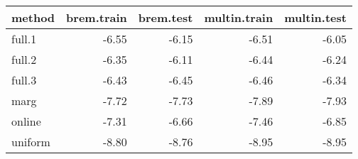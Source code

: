 \begin{table}[ht]
\begin{center}
\begin{tabular}{lrrrr}
  \hline
method & brem.train & brem.test & multin.train & multin.test \\ 
  \hline
full.1 & -6.55 & -6.15 & -6.51 & -6.05 \\ 
  full.2 & -6.35 & -6.11 & -6.44 & -6.24 \\ 
  full.3 & -6.43 & -6.45 & -6.46 & -6.34 \\ 
  marg & -7.72 & -7.73 & -7.89 & -7.93 \\ 
  online & -7.31 & -6.66 & -7.46 & -6.85 \\ 
  uniform & -8.80 & -8.76 & -8.95 & -8.95 \\ 
   \hline
\end{tabular}
\end{center}
\end{table}
